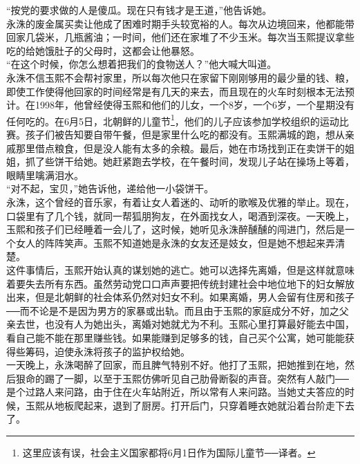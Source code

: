 “按党的要求做的人是傻瓜。现在只有钱才是王道，”他告诉她。\\

永洙的废金属买卖让他成了困难时期手头较宽裕的人。每次从边境回来，他都能带回家几袋米，几瓶酱油；一时间，他们还在家堆了不少玉米。每次当玉熙提议拿些吃的给她饿肚子的父母时，这都会让他暴怒。\\

“在这个时候，你怎么想着把我们的食物送人？”他大喊大叫道。\\

永洙不信玉熙不会帮衬家里，所以每次他只在家留下刚刚够用的最少量的钱、粮，即使工作使得他回家的时间经常是有几天的来去，而且现在的火车时刻根本无法预计。在1998年，他曾经使得玉熙和他们的儿女，一个8岁，一个6岁，一个星期没有任何吃的。在6月5日，北朝鲜的儿童节\footnote{这里应该有误，社会主义国家都将6月1日作为国际儿童节──译者。}，他们的儿子应该参加学校组织的运动比赛。孩子们被告知要自带午餐，但是家里什么吃的都没有。玉熙满城的跑，想从亲戚那里借点粮食，但是没人能有太多的余粮。最后，她在市场找到正在卖饼干的姐姐，抓了些饼干给她。她赶紧跑去学校，在午餐时间，发现儿子站在操场上等着，眼睛里噙满泪水。\\

“对不起，宝贝，”她告诉他，递给他一小袋饼干。\\

永洙，这个曾经的音乐家，有着让女人着迷的、动听的歌喉及优雅的举止。现在，口袋里有了几个钱，就同一帮狐朋狗友，在外面找女人，喝酒到深夜。一天晚上，玉熙和孩子们已经睡着一会儿了，这时候，她听见永洙醉醺醺的闯进门，然后是一个女人的阵阵笑声。玉熙不知道她是永洙的女友还是妓女，但是她不想起来弄清楚。\\

这件事情后，玉熙开始认真的谋划她的逃亡。她可以选择先离婚，但是这样就意味着要失去所有东西。虽然劳动党口口声声要把传统封建社会中地位地下的妇女解放出来，但是北朝鲜的社会体系仍然对妇女不利。如果离婚，男人会留有住房和孩子──而不论是不是因为男方的家暴或出轨。而且由于玉熙的家庭成分不好，加之父亲去世，也没有人为她出头，离婚对她就尤为不利。玉熙心里打算最好能去中国，看自己能不能在那里赚些钱。如果能赚到足够多的钱，自己买个公寓，她可能能获得些筹码，迫使永洙将孩子的监护权给她。\\

一天晚上，永洙喝醉了回家，而且脾气特别不好。他打了玉熙，把她推到在地，然后狠命的踢了一脚，以至于玉熙仿佛听见自己肋骨断裂的声音。突然有人敲门──是个过路人来问路，由于住在火车站附近，所以常有人来问路。当她丈夫答应的时候，玉熙从地板爬起来，退到了厨房。打开后门，只穿着睡衣她就沿着台阶走下去了。\\

